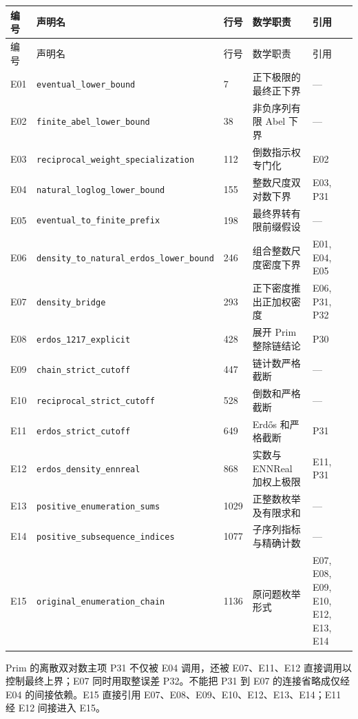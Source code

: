 {\footnotesize
\setlength{\tabcolsep}{3pt}
\begin{longtable}{@{}p{.06\linewidth}p{.34\linewidth}p{.06\linewidth}p{.26\linewidth}p{.20\linewidth}@{}}
\toprule 编号 & 声明名 & 行号 & 数学职责 & 引用\\\midrule
\endfirsthead
\toprule 编号 & 声明名 & 行号 & 数学职责 & 引用\\\midrule
\endhead
E01 & \nolinkurl{eventual_lower_bound} & 7 & 正下极限的最终正下界 & ---\\
E02 & \nolinkurl{finite_abel_lower_bound} & 38 & 非负序列有限 Abel 下界 & ---\\
E03 & \nolinkurl{reciprocal_weight_specialization} & 112 & 倒数指示权专门化 & E02\\
E04 & \nolinkurl{natural_loglog_lower_bound} & 155 & 整数尺度双对数下界 & E03, P31\\
E05 & \nolinkurl{eventual_to_finite_prefix} & 198 & 最终界转有限前缀假设 & ---\\
E06 & \nolinkurl{density_to_natural_erdos_lower_bound} & 246 & 组合整数尺度密度下界 & E01, E04, E05\\
E07 & \nolinkurl{density_bridge} & 293 & 正下密度推出正加权密度 & E06, P31, P32\\
E08 & \nolinkurl{erdos_1217_explicit} & 428 & 展开 Prim 整除链结论 & P30\\
E09 & \nolinkurl{chain_strict_cutoff} & 447 & 链计数严格截断 & ---\\
E10 & \nolinkurl{reciprocal_strict_cutoff} & 528 & 倒数和严格截断 & ---\\
E11 & \nolinkurl{erdos_strict_cutoff} & 649 & Erdős 和严格截断 & P31\\
E12 & \nolinkurl{erdos_density_ennreal} & 868 & 实数与 ENNReal 加权上极限 & E11, P31\\
E13 & \nolinkurl{positive_enumeration_sums} & 1029 & 正整数枚举及有限求和 & ---\\
E14 & \nolinkurl{positive_subsequence_indices} & 1077 & 子序列指标与精确计数 & ---\\
E15 & \nolinkurl{original_enumeration_chain} & 1136 & 原问题枚举形式 & E07, E08, E09, E10, E12, E13, E14\\
\bottomrule
\end{longtable}}

Prim 的离散双对数主项 P31 不仅被 E04 调用，还被 E07、E11、E12 直接调用以控制最终上界；E07 同时用取整误差 P32。不能把 P31 到 E07 的连接省略成仅经 E04 的间接依赖。E15 直接引用 E07、E08、E09、E10、E12、E13、E14；E11 经 E12 间接进入 E15。

